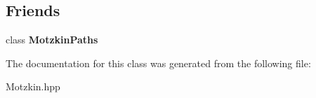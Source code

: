 \subsection*{Friends}
\begin{DoxyCompactItemize}
\item 
\hypertarget{classdscr_1_1_motzkin_paths_1_1iterator_a0cb884f189893d9dd0b61104eb3a97ac}{class {\bfseries Motzkin\-Paths}}\label{classdscr_1_1_motzkin_paths_1_1iterator_a0cb884f189893d9dd0b61104eb3a97ac}

\end{DoxyCompactItemize}


The documentation for this class was generated from the following file\-:\begin{DoxyCompactItemize}
\item 
Motzkin.\-hpp\end{DoxyCompactItemize}
